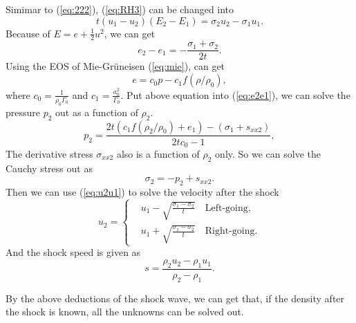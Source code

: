 \documentclass[review]{elsarticle}
\begin{document}
Simimar to (\ref{eq:222}), (\ref{eq:RH3}) can be changed into
\begin{equation}
  t(u_1-u_2)(E_2-E_1) =\sigma_2 u_2-\sigma_1u_1.
\end{equation}
Because of $E= e+\frac{1}{2}u^2$, we can get
\begin{equation}\label{eq:e2e1}
  e_2 - e_1 = - \frac{\sigma_1 +\sigma_2}{2t}.
\end{equation}
Using the EOS of Mie-Gr\"uneisen (\ref{eq:mie}), can get
\begin{equation}
  e = c_0p -c_1f(\rho/\rho_0),
\end{equation}
where $c_0 = \frac{1}{\rho_0\Gamma_0}$ and $c_1 = \frac{a_0^2}{\Gamma_0}$.
Put above equation into (\ref{eq:e2e1}), we can solve the pressure $p_2$ out as a function of $\rho_2$. 
\begin{equation}\label{eq:shocke}
  p_2= \frac{2t(c_1f(\rho_2/\rho_0)+e_1)-(\sigma_1+s_{xx2})}{2tc_0-1},
\end{equation}
The derivative stress $\sigma_{xx2}$ also is  a function of $\rho_2$ only. So we can solve the Cauchy stress out as
\begin{equation}
  \sigma_2 = -p_2 +s_{xx2}.
\end{equation}
Then we can use (\ref{eq:u2u1}) to solve the velocity after the shock
\begin{equation}\label{eq:shocku}
  u_2 = \left\{ \begin{aligned}
	 & u_1 - \sqrt{\frac{\sigma_1- \sigma_2}{t}} \quad \text{Left-going}, \\
	 & u_1 + \sqrt{\frac{\sigma_1- \sigma_2}{t}} \quad \text{Right-going}.
	\end{aligned}
	\right.
  \end{equation}
And the shock speed is given as 
\begin{equation}
  s = \frac{\rho_2u_2-\rho_1u_1}{\rho_2-\rho_1}.
\end{equation}

By the above deductions of the shock wave, we can get that, if the density after the shock is known, all the unknowns can be solved out.
\end{document}
